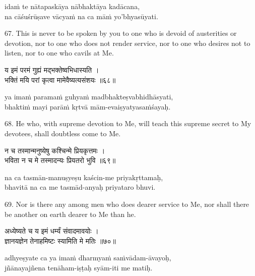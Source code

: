 \begin{transliteration}
idaṁ te nātapaskāya nābhaktāya kadācana, \\
na cāśuśrūṣave vācyaṁ na ca māṁ yo'bhyasūyati.
\end{transliteration}

67. This is never to be spoken by you to one who is devoid of austerities or
devotion, nor to one who does not render service, nor to one who desires not to
listen, nor to one who cavils at Me.

\begin{gitaverse}
य इमं परमं गुह्यं मद्भक्तेष्वभिधास्यति । \\
भक्तिं मयि परां कृत्वा मामेवैष्यत्यसंशयः ॥६८॥
\end{gitaverse}

\begin{transliteration}
ya imaṁ paramaṁ guhyaṁ madbhakteṣvabhidhāsyati, \\
bhaktiṁ mayi parāṁ kṛtvā mām-evaiṣyatyasaṁśayaḥ.
\end{transliteration}

68. He who, with supreme devotion to Me, will teach this supreme secret to My
devotees, shall doubtless come to Me.

\begin{gitaverse}
न च तस्मान्मनुष्येषु कश्चिन्मे प्रियकृत्तमः । \\
भविता न च मे तस्मादन्यः प्रियतरो भुवि ॥६९॥
\end{gitaverse}

\begin{transliteration}
na ca tasmān-manuṣyeṣu kaścin-me priyakṛttamaḥ, \\
bhavitā na ca me tasmād-anyaḥ priyataro bhuvi.
\end{transliteration}

69. Nor is there any among men who does dearer service to Me, nor shall there
be another on earth dearer to Me than he.

\begin{gitaverse}
अध्येष्यते च य इमं धर्म्यं संवादमावयोः । \\
ज्ञानयज्ञेन तेनाहमिष्टः स्यामिति मे मतिः ॥७०॥
\end{gitaverse}

\begin{transliteration}
adhyeṣyate ca ya imaṁ dharmyaṁ saṁvādam-āvayoḥ, \\
jñānayajñena tenāham-iṣṭaḥ syām-iti me matiḥ.
\end{transliteration}

